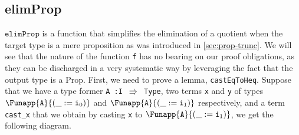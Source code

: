\documentclass[12pt,twoside,maitrise]{dms}
\theoremstyle{definition}
\numberwithin{equation}{section}
\numberwithin{table}{chapter}
\numberwithin{figure}{chapter}
\newcommand\kw[1] {\textsf{#1}}
\newcommand\id[1] {\texttt{#1}}
\newcommand\fn[1] {\texttt{#1}}
\begin{document}
\subsection*{elimProp}
$\id{elimProp}$ is a function that simplifies the elimination of a quotient when
the target type is a mere proposition as was introduced in
\autoref{sec:prop-trunc}. We will see that the nature of the function \id{f} has
no bearing on our proof obligations, as they can be discharged in a very
systematic way by leveraging the fact that the output type is a \kw{Prop}.
First, we need to prove a lemma, \id{castEqToHeq}. Suppose that we have a type
former \fn{A :\@ I $\Rrightarrow$ Type}, two terms \id{x} and \id{y} of
types $\Funapp{\id{A}}{(\earg{\_}{\ileft})}$ and
$\Funapp{\id{A}}{(\earg{\_}{\iright})}$ respectively, and a term \id{cast\_x}
that we obtain by casting \id{x} to $\Funapp{\id{A}}{(\earg{\_}{\iright})}$, we
get the following diagram.
\end{document}
